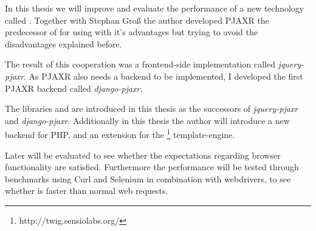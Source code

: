 In this thesis we will improve and evaluate the performance of a new technology called \lare{}.
Together with Stephan Gro{\ss} the author developed PJAXR the predecessor of \lare{} for using \ajax{} with it's advantages but trying to avoid the disadvantages explained before.

The result of this cooperation was a frontend-side implementation called \emph{jquery-pjaxr}.
As PJAXR also needs a backend to be implemented, I developed the first PJAXR backend called \emph{django-pjaxr}.

The libraries \lareJS{} and \djangoLare{} are introduced in this thesis as the successors of \emph{jquery-pjaxr} and \emph{django-pjaxr}.
Additionally in this thesis the author will introduce a new \lare{} backend for PHP, \emph{\phpLare{}} and \emph{\twigLare{}} an extension for the \twig{}\footnote{http://twig.sensiolabs.org/} template-engine.

Later \lare{} will be evaluated to see whether the expectations regarding browser functionality are satisfied.
Furthermore the performance will be tested through benchmarks using Curl and Selenium in combination with webdrivers, to see whether \lare{} is faster than normal web requests.
